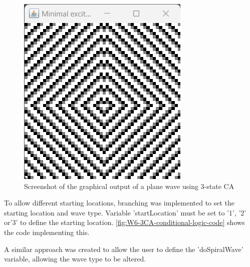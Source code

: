 \begin{figure}[H] 
    \centering
    \includegraphics[width=0.49\columnwidth]{Figures/Week 6/3stateCA-plane-output.png}
    \caption{Screenshot of the graphical output of a plane wave using 3-state CA}
    \label{fig:W6-3CA-plane-output}
\end{figure}



To allow different starting locations, branching was implemented to set the starting location and wave type. Variable 'startLocation' must be set to '1', '2' or'3' to define the starting location. \autoref{fig:W6-3CA-conditional-logic-code} shows the code implementing this.

A similar approach was created to allow the user to define the 'doSpiralWave' variable, allowing the wave type to be altered.

